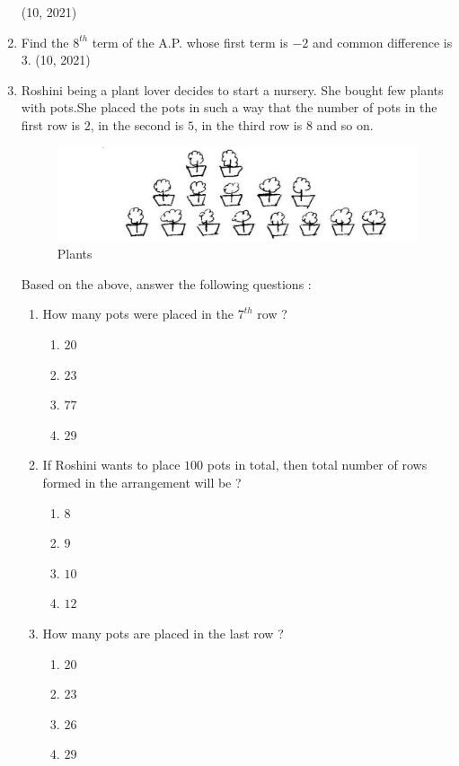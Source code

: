 \begin{enumerate}[label=\thesubsection.\arabic*,ref=\thesubsection.\theenumi,itemsep=1pt]
	\hfill (10,  2021) \item Find the $8^{th}$ term of the A.P. whose first term is $-2$ and common difference is $3$.
	\hfill (10, 2021) \item
	Roshini being a plant lover decides to start a nursery. She bought few plants with pots.She placed the pots in such a way that the number of pots in the first row is $2$, in the second is $5$, in the third row is $8$ and so on.
		\begin{figure}[h]
			\centering	
			\includegraphics[width=\columnwidth]{figs/ap/Plant.png}
			\caption{Plants}
			\label{fig:Plants}
		\end{figure}
		Based on the above, answer the following questions :
		\begin{enumerate}[label=(\roman*)]
\item How many pots were placed in the $7^{th}$ row ?
				\begin{enumerate}[label=\Alph*]
					 \item $20$
					 \item $23$
					 \item $77$
					 \item $29$
				\end{enumerate}
 \item If Roshini wants to place $100$ pots in total, then total number of rows formed in the arrangement will be ?
				\begin{enumerate}[label=\Alph*]
					 \item $8$
					 \item $9$
					 \item $10$
					 \item $12$
				\end{enumerate}
 \item How many pots are placed in the last row ?
				\begin{enumerate}[label=\Alph*]
					 \item $20$
					 \item $23$
					 \item $26$
					 \item $29$
				\end{enumerate}

\end{enumerate}
\end{enumerate}

